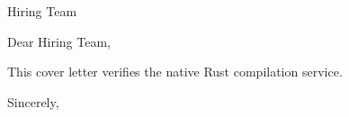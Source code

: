 \documentclass{letter}
\begin{document}
\begin{letter}{Hiring Team}
\opening{Dear Hiring Team,}
This cover letter verifies the native Rust compilation service.
\closing{Sincerely,}
\end{letter}
\end{document}
